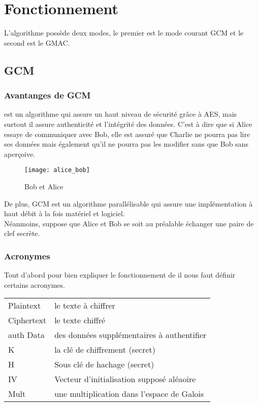\chapter{Fonctionnement}
\label{chap:fonctionnement}

L'algorithme \aes possède deux modes, le premier est le mode courant GCM et le second est le GMAC.

\section{GCM}

\subsection{Avantanges de GCM}

\aes est un algorithme qui assure un haut niveau de sécurité grâce à AES, mais surtout il assure authenticité et l'intégrité des données. C'est à dire que si Alice essaye de communiquer avec Bob, elle est assuré que Charlie ne pourra pas lire ses données mais également qu'il ne pourra pas les modifier sans que Bob sans aperçoive. 

\begin{figure}[!h]
  \centering
  \texttt{[image: alice\_bob]}
  \caption{Bob et Alice}
  \label{Bob et Alice}
\end{figure}


De plus, GCM est un algorithme parallélisable qui assure une implémentation à haut débit à la fois matériel et logiciel.
~\\

Néanmoins, \aes suppose que Alice et Bob se soit au préalable échanger une paire de clef secrète.

\subsection{Acronymes}


Tout d'abord pour bien expliquer le fonctionnement de \aes il nous faut définir certains acronymes.

\begin{center}
  \begin{tabular}[h]{|l|l|}
    \hline
    Plaintext&le texte à chiffrer\\
    Ciphertext&le texte chiffré\\
    auth Data&des données supplémentaires à authentifier\\
    K&la clé de chiffrement (secret)\\
    H&Sous clé de hachage (secret)\\
    IV& Vecteur d'initialisation supposé aléaoire\\
    Mult&une multiplication dans l'espace de Galois\\
    \hline
  \end{tabular}
\end{center}


